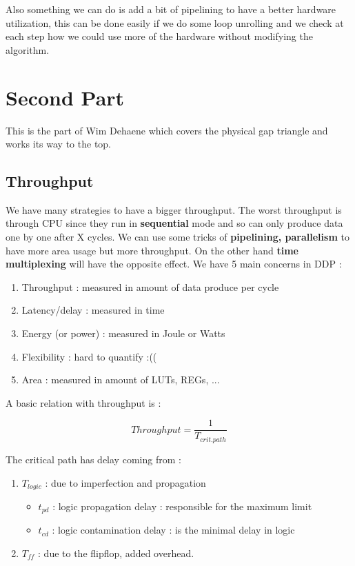 \documentclass{report}
\begin{document}
Also something we can do is add a bit of pipelining to have a better hardware utilization, this can be done easily if we do some loop unrolling and we check at each step how we could use more of the hardware without modifying the algorithm.


\chapter{Second Part}

This is the part of Wim Dehaene which covers the physical gap triangle and works its way to the top.

\section{Throughput}

We have many strategies to have a bigger throughput. The worst throughput is through CPU since they run in \textbf{sequential} mode and so can only produce data one by one after X cycles. We can use some tricks of \textbf{pipelining, parallelism} to have more area usage but more throughput. On the other hand \textbf{time multiplexing} will have the opposite effect. We have 5 main concerns in DDP : 

\begin{enumerate}
    \item Throughput : measured in amount of data produce per cycle
    \item Latency/delay : measured in time
    \item Energy (or power) : measured in Joule or Watts
    \item Flexibility  : hard to quantify :((
    \item Area : measured in amount of LUTs, REGs, ...
\end{enumerate}

A basic relation with throughput is : 

\begin{equation}
    Throughput = \frac{1}{T_{crit. path}}
\end{equation}

The critical path has delay coming from : 
\begin{enumerate}
    \item $T_{logic}$ : due to imperfection and propagation
    \begin{itemize}
        \item $t_{pd}$ : logic propagation delay : responsible for the maximum limit
        \item $t_{cd}$ : logic contamination delay : is the minimal delay in logic
    \end{itemize}
    \item $T_{ff}$ : due to the flipflop, added overhead.
\end{enumerate}
\end{document}
